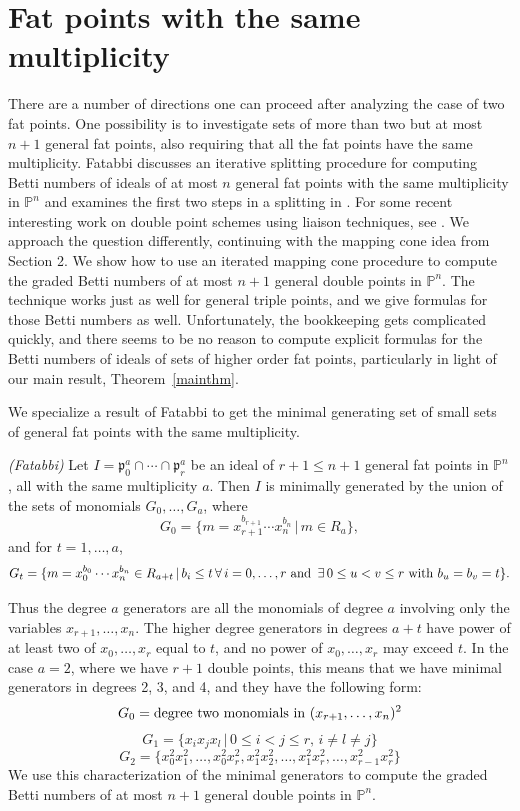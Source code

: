 \documentclass{article}
\begin{document}
\section[3]{Fat points with the same multiplicity}\label{s:same}

There are a number of directions one can proceed after analyzing the case of two fat points. One possibility is to investigate sets of more than two but at most $n+1$ general fat points, also requiring that all the fat points have the same multiplicity. Fatabbi discusses an iterative splitting procedure for computing Betti numbers of ideals of at most $n$ general fat points with the same multiplicity in $\mathbb{P}^n$ and examines the first two steps in a splitting in \cite{Fatabbi}. For some recent interesting work on double point schemes using liaison techniques, see \cite{GMS}. We approach the question differently, continuing with the mapping cone idea from Section 2. We show how to use an iterated mapping cone procedure to compute the graded Betti numbers of at most $n+1$ general double points in $\mathbb P^n$. The technique works just as well for general triple points, and we give formulas for those Betti numbers as well. Unfortunately, the bookkeeping gets complicated quickly, and there seems to be no reason to compute explicit formulas for the Betti numbers of ideals of sets of higher order fat points, particularly in light of our main result, Theorem~\ref{mainthm}.

We specialize a result of Fatabbi \cite{Fatabbi} to get the minimal generating set of small sets of general fat points with the same multiplicity.

\begin{proposition}
\label{mingens}
\emph{(Fatabbi)} Let  $I = \mathfrak p_0^{a} \cap \cdots \cap \mathfrak p_r^{a}$ be an ideal of $r+1 \le n+1$ general fat points in $\mathbb P^n$, all with the same multiplicity $a$. Then $I$ is minimally generated by the union of the sets of monomials $G_0,\dots,G_a$, where \[ G_0 = \{ m=x_{r+1}^{b_{r+1}}\cdots x_n^{b_n} \, | \, m \in R_{a}\},\] and for $t=1,\dots,a$, \[ G_t = \{ m=x_0^{b_0} \cdots x_n^{b_n} \in R_{a+t} \, | \, b_i \le t \, \forall \, i=0,\dots,r \hbox{ and } \, \exists \, 0 \le u < v \le r \hbox{ with } b_u=b_v=t\}. \]
\end{proposition}

Thus the degree $a$ generators are all the monomials of degree $a$ involving only the variables $x_{r+1},\dots,x_n$. The higher degree generators in degrees $a+t$ have power of at least two of $x_0,\dots,x_r$ equal to $t$, and no power of $x_0,\dots,x_r$ may exceed $t$. In the case $a=2$, where we have $r+1$ double points, this means that we have minimal generators in degrees 2, 3, and 4, and they have the following form: \[ G_0 = \hbox{degree two monomials in } (x_{r+1},\dots,x_n)^2 \] \[ G_1 = \{x_ix_jx_l \, | \, 0 \le i < j \le r, \, i \not = l \not = j \} \] \[ G_2 = \{ x_0^2x_1^2,\dots,x_0^2x_r^2,x_1^2x_2^2,\dots,x_1^2x_r^2,\dots,x_{r-1}^2x_r^2 \} \] We use this characterization of the minimal generators to compute the graded Betti numbers of at most $n+1$ general double points in $\mathbb P^n$.
\end{document}
